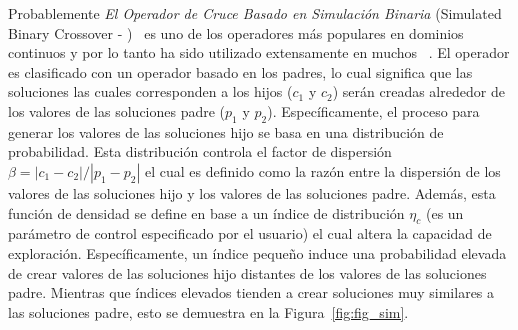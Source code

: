 Probablemente \textit{El Operador de Cruce Basado en Simulación Binaria} (Simulated Binary Crossover - \SBX{})~\cite{deb1994simulated} es uno de los operadores más populares en dominios continuos y por lo tanto ha sido utilizado extensamente en muchos \MOEAS{}~\cite{Joel:NSGAII,Joel:SMSEMOA}.
%
El operador \SBX{} es clasificado con un operador basado en los padres, lo cual significa que las soluciones las cuales corresponden a los hijos ($c_1$ y $c_2$) serán creadas alrededor de los valores de las soluciones padre ($p_1$ y $p_2$).
%
Específicamente, el proceso para generar los valores de las soluciones hijo se basa en una distribución de probabilidad.
%
Esta distribución controla el factor de dispersión $\beta = |c_1 - c_2 | / |p_1 - p_2|$ el cual es definido como la razón entre la dispersión de los valores de las soluciones hijo y los valores de las soluciones padre.
%
Además, esta función de densidad se define en base a un índice de distribución $\eta_c$ (es un parámetro de control especificado por el usuario) el cual altera la capacidad de exploración.
%
Específicamente, un índice pequeño induce una probabilidad elevada de crear valores de las soluciones hijo distantes de los valores de las soluciones padre.
Mientras que índices elevados tienden a crear soluciones muy similares a las soluciones padre, esto se demuestra en la Figura~\ref{fig:fig_sim}.
%

